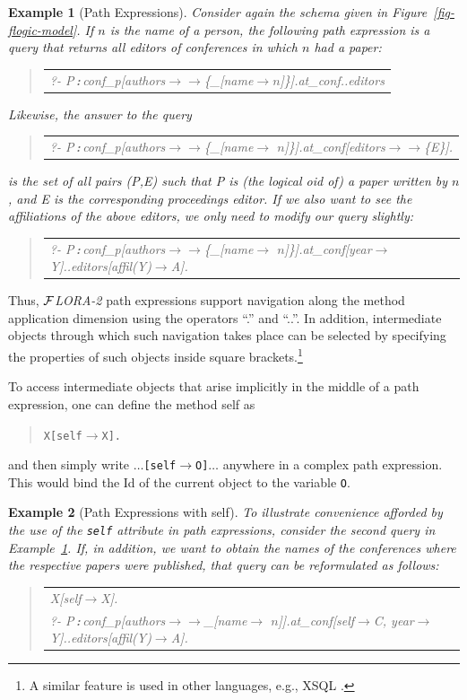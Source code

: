 \documentclass[11pt]{article}
\newtheorem{example}{Example}[section]
\newenvironment{qrules}{\begin{quote}\tt\begin{tabular}[t]{l}}%
{\end{tabular}\end{quote}}
\newcommand{\isa}{\,{\bf{:}}\,}
\newcommand{\fd}{\ensuremath{{\rightarrow}}}                   %
\newcommand{\mvd}{\ensuremath{{\rightarrow\!\!\!\!\rightarrow}}}  %
\newcommand{\anon}{\_}
\newcommand{\FLORA}{{\mbox{${\cal F}${\small\it LORA}\rm\emph{-2}}}\xspace}
\begin{document}
\begin{example}[Path Expressions]\label{Ex:PathExpr}
  \rm Consider again the schema given in Figure~\ref{fig-flogic-model}.  If
  $n$ is the name of a person, the following path expression is a query
  that returns all editors of conferences in which $n$ had a paper:
  \begin{qrules}
    ?- P\isa conf\_p[authors\mvd\{\anon [name\fd $n$]\}].at\_conf..editors
  \end{qrules}
  Likewise, the answer to the query
  \begin{qrules}
    ?- P\isa conf\_p[authors\mvd\{\anon [name\fd
    $n$]\}].at\_conf[editors\mvd\{E\}].
  \end{qrules}
  is the set of all pairs (\textsf{P},\textsf{E}) such that \textsf{P} is
  (the logical oid of) a paper written by $n$, and \textsf{E} is the
  corresponding proceedings editor.  If we also want to see the
  affiliations of the above editors, we only need to modify our query
  slightly:
  \begin{qrules}
    ?- P\isa conf\_p[authors\mvd\{\anon [name\fd
    $n$]\}].at\_conf[year\fd Y]..editors[affil(Y)\fd A].
  \end{qrules}
\end{example}
Thus, \FLORA path expressions support navigation 
along the method application dimension using the operators
``.''  and
``..''. In addition, intermediate objects through which such navigation
takes place can be selected by specifying the properties of such objects
inside square brackets.\footnote{
  A similar feature is used in other languages, e.g., XSQL \cite{xsql-92}.
  }

To access intermediate objects that arise implicitly in the middle
of a path expression, one can define the method \textsf{self} as
\begin{quote}
  {\tt X[self{\fd}X].} 
\end{quote}
and then simply write $\dots${\tt [self{\fd}O]}$\dots$ anywhere in a
complex path expression. This would bind the Id of the current object to
the variable {\tt O}.

\begin{example}[Path Expressions with \textsf{self}]\label{ex-path-self}
  \rm{
    To illustrate convenience afforded by the use of the {\tt self}
    attribute in path expressions, consider the second query in
    Example~\ref{Ex:PathExpr}. If, in addition, we want to obtain the names
    of the conferences where the respective papers were published, that
    query can be reformulated as follows:
    }
  \begin{qrules}
    X[self\fd X].\\
    ?- P\isa conf\_p[authors\mvd\anon [name\fd
    $n$]].at\_conf[self\fd C, year\fd Y]..editors[affil(Y)\fd A]. 
  \end{qrules}
\end{example}
\end{document}
